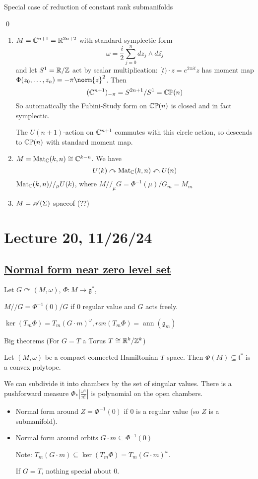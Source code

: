 \documentclass[x11names,reqno,14pt]{extarticle}
\newcommand{\mk}[1]{\mathfrak{#1}}
\newcommand{\g}{\mk{g}}
\renewcommand{\t}{\mk{t}}
\DeclareMathOperator{\ann}{ann}
\begin{document}
\proof

Special case of reduction of constant rank submanifolds

\qed

\exm

\begin{enumerate}

\item $M = \mathbb{C}^{n + 1} = \mathbb{R}^{2n + 2}$ with standard symplectic form 
\[
\omega = \frac{i}{2}\sum_{j=0}^ndz_j\wedge d\bar{z_j}
\]
and let $S^1 = \mathbb{R}/\mathbb{Z}$ act by scalar multiplication: $[t) \cdot z = e^{2\pi i t}z$ has moment map $\Phi(z_0,\dots,z_n) = -\pi\norm{z}^2$. Then 
\[
(\mathbb{C}^{n+1})_{-\pi} = S^{2n + 1}/S^1 = {\mathbb{CP}}(n)
\]
So automatically the Fubini-Study form on ${\mathbb{CP}}(n)$ is closed and in fact symplectic. 

The $U(n+1)$-action on $\mathbb{C}^{n+1}$ commutes with this circle action, so descends to ${\mathbb{CP}}(n)$ with standard moment map. 

\item $M = {\mathrm{Mat}}_{\mathbb{C}}(k,n) \cong \mathbb{C}^{k-n}$. We have
\[
U(k) \curvearrowright {\mathrm{Mat}}_{\mathbb{C}}(k,n) \curvearrowleft U(n)
\]
${\mathrm{Mat}}_{\mathbb{C}}(k,n) //_\mu U(k)$, where $M//_\mu G = \Phi^{-1}(\mu)/G_m = M_m$

\item $M = \mathscr{A}(\Sigma)$ spaceof (??)


\end{enumerate}

\section*{Lecture 20, 11/26/24}

\subsection*{\underline{Normal form near zero level set}}

Let $G\curvearrowright (M,\omega)$, $\Phi:M\to\g^*$, 

$M//G = \Phi^{-1}(0)/G$ if 0 regular value and $G$ acts freely. 

$\ker(T_m\Phi) = T_m(G\cdot m)^\omega, ran(T_m\Phi) = \ann(\g_m)$


Big theorems (For $G = T$ a Torus $T \cong \mathbb{R}^k/\mathbb{Z}^k$) 

Let $(M,\omega)$ be a compact connected Hamiltonian $T$-space. Then $\Phi(M) \subseteq \t^*$ is a convex polytope. 

We can subdivide it into chambers by the set of singular values. There is a pushforward measure $\Phi_*|\frac{\omega^n}{n!}|$ is polynomial on the open chambers. 
\begin{itemize}

\item Normal form around $Z = \Phi^{-1}(0)$ if 0 is a regular value (so $Z$ is a submanifold). 

\item Normal form around orbits $G \cdot m \subseteq \Phi^{-1}(0)$

Note: $T_m(G\cdot m) \subseteq \ker(T_m\Phi) = T_m(G\cdot m)^\omega$.

If $G = T$, nothing special about 0. 

\end{itemize}
\end{document}
